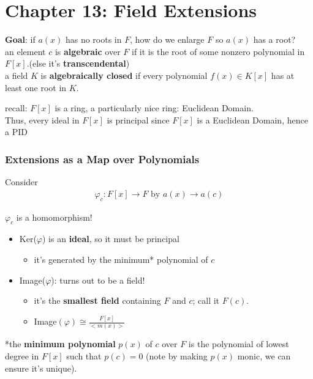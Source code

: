 \documentclass[12pt]{article}
\newcommand{\bt}[1]{\textbf{#1}} %
\newcommand{\eq}[1]{\begin{align*}#1\end{align*}} %
\newcommand{\gray}[1]{\textcolor[gray]{0.5}{#1}} %
\begin{document}


\part*{Chapter 13: Field Extensions}

\bt{Goal}: if $a(x)$ has no roots in $F$, how do we enlarge $F$ so $a(x)$ has a root? \\

an element $c$ is \bt{algebraic} over $F$ if it is the root of some nonzero polynomial in $F[x]$.(else it's \bt{transcendental})\\

a field $K$ is \bt{algebraically closed} if every polynomial $f(x) \in K[x]$ has at least one root in $K$.

recall: $F[x]$ is a ring, a particularly nice ring: Euclidean Domain. \\
Thus, every ideal in $F[x]$ is principal 
\gray{since $F[x]$ is a Euclidean Domain, hence a PID}\\

\section*{Extensions as a Map over Polynomials}
Consider 
\eq{\varphi_c : F[x] \rightarrow F \text{ by } a(x) \rightarrow a(c)}

$\varphi_c$ is a homomorphism! \\
\begin{itemize}
    \item Ker($\varphi$) is an \bt{ideal}, so it must be principal
    \begin{itemize}
        \item it's generated by the minimum* polynomial of $c$
    \end{itemize}
    \item Image($\varphi$): turns out to be a field! 
    \begin{itemize}
        \item it's the \bt{smallest field} containing $F$ and $c$; call it $F(c)$.
        \item Image$(\varphi) \cong \frac{F[x]}{<m(x)>}$
    \end{itemize}
\end{itemize}

*the \bt{minimum polynomial} $p(x)$ of $c$ over $F$ is the polynomial of lowest degree in $F[x]$ such that $p(c) = 0$ (note by making $p(x)$ monic, we can ensure it's unique).
\end{document}
